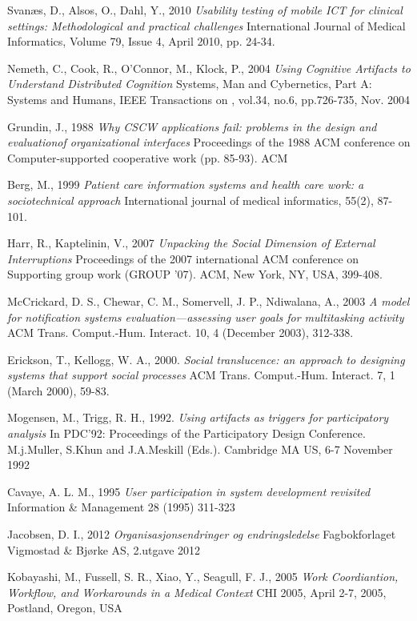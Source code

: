 \documentclass[b5paper, 11pt, norsk]{MScthesisITEM}
\begin{document}
\begin{thebibliography}{99}
Svanæs, D., Alsos, O., Dahl, Y., 2010
\emph{Usability testing of mobile ICT for clinical settings: Methodological and practical challenges}
International Journal of Medical Informatics, Volume 79, Issue 4, April 2010, pp. 24-34.

Nemeth, C., Cook, R., O'Connor, M., Klock, P., 2004
\emph{Using Cognitive Artifacts to Understand Distributed Cognition}
Systems, Man and Cybernetics, Part A: Systems and Humans, IEEE Transactions on , vol.34, no.6, pp.726-735, Nov. 2004

Grundin, J., 1988
\emph{Why CSCW applications fail: problems in the design and evaluationof organizational interfaces}
Proceedings of the 1988 ACM conference on Computer-supported cooperative work (pp. 85-93). ACM

Berg, M., 1999
\emph{Patient care information systems and health care work: a sociotechnical approach}
International journal of medical informatics, 55(2), 87-101.

Harr, R., Kaptelinin, V., 2007
\emph{Unpacking the Social Dimension of External Interruptions}
Proceedings of the 2007 international ACM conference on Supporting group work (GROUP '07). ACM, New York, NY, USA, 399-408.

McCrickard, D. S., Chewar, C. M., Somervell, J. P., Ndiwalana, A., 2003
\emph{A model for notification systems evaluation—assessing user goals for multitasking activity}
ACM Trans. Comput.-Hum. Interact. 10, 4 (December 2003), 312-338.

Erickson, T., Kellogg, W. A., 2000. 
\emph{Social translucence: an approach to designing systems that support social processes} ACM Trans. Comput.-Hum. Interact. 7, 1 (March 2000), 59-83.

Mogensen, M., Trigg, R. H., 1992.
\emph{Using artifacts as triggers for participatory analysis}
In PDC'92: Proceedings of the Participatory Design Conference. M.j.Muller, S.Khun and J.A.Meskill (Eds.). Cambridge MA US, 6-7 November 1992

Cavaye, A. L. M., 1995
\emph{User participation in system development revisited}
Information \& Management 28 (1995) 311-323

Jacobsen, D. I., 2012
\emph{Organisasjonsendringer og endringsledelse}
Fagbokforlaget Vigmostad \& Bjørke AS, 2.utgave 2012


Kobayashi, M., Fussell, S. R., Xiao, Y., Seagull, F. J., 2005
\emph{Work Coordiantion, Workflow, and Workarounds in a Medical Context}
CHI 2005, April 2-7, 2005, Postland, Oregon, USA


\end{thebibliography}
\end{document}
